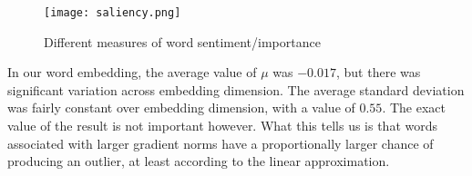 \begin{figure}
    \centering
    \texttt{[image: saliency.png]}
    \caption{Different measures of word sentiment/importance}
    \label{fig:saliency}
\end{figure}

In our word embedding, the average value of $\mu$ was $-0.017$, but there was significant variation across embedding dimension.  The average standard deviation was fairly constant over embedding dimension, with a value of $0.55$.  The exact value of the result is not important however.  What this tells us is that words associated with larger gradient norms have a proportionally larger chance of producing an outlier, at least according to the linear approximation.
